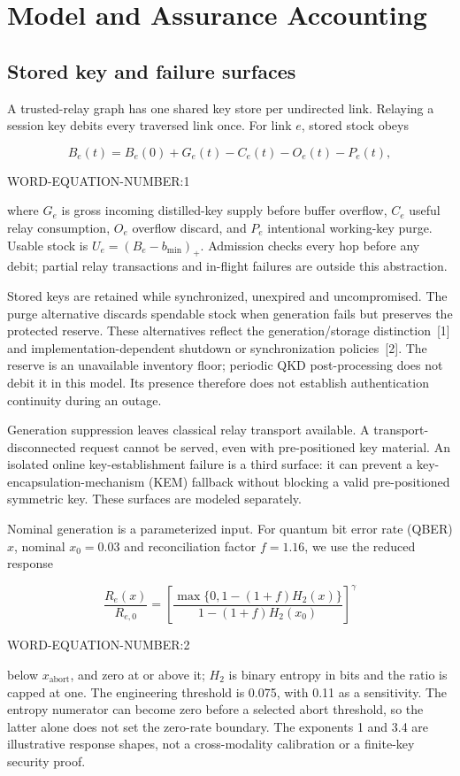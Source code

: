 \documentclass[conference,a4paper]{IEEEtran}
\begin{document}
\section{Model and Assurance Accounting}\label{sec:model}
\subsection{Stored key and failure surfaces}
A trusted-relay graph has one shared key store per undirected link. Relaying a session key debits every traversed link once. For link $e$, stored stock obeys


\[
B_e(t)=B_e(0)+G_e(t)-C_e(t)-O_e(t)-P_e(t),
\]

WORD-EQUATION-NUMBER:1


where $G_e$ is gross incoming distilled-key supply before buffer overflow, $C_e$ useful relay consumption, $O_e$ overflow discard, and $P_e$ intentional working-key purge. Usable stock is $U_e=(B_e-b_{\min})_+$. Admission checks every hop before any debit; partial relay transactions and in-flight failures are outside this abstraction.

Stored keys are retained while synchronized, unexpired and uncompromised. The purge alternative discards spendable stock when generation fails but preserves the protected reserve. These alternatives reflect the generation/storage distinction~[1] and implementation-dependent shutdown or synchronization policies~[2]. The reserve is an unavailable inventory floor; periodic QKD post-processing does not debit it in this model. Its presence therefore does not establish authentication continuity during an outage.

Generation suppression leaves classical relay transport available. A transport-disconnected request cannot be served, even with pre-positioned key material. An isolated online key-establishment failure is a third surface: it can prevent a key-encapsulation-mechanism (KEM) fallback without blocking a valid pre-positioned symmetric key. These surfaces are modeled separately.

Nominal generation is a parameterized input. For quantum bit error rate (QBER) $x$, nominal $x_0=0.03$ and reconciliation factor $f=1.16$, we use the reduced response


\[
\frac{R_e(x)}{R_{e,0}}=\left[\frac{\max\{0,1-(1+f)H_2(x)\}}{1-(1+f)H_2(x_0)}\right]^{\gamma}
\]

WORD-EQUATION-NUMBER:2


below $x_{\mathrm{abort}}$, and zero at or above it; $H_2$ is binary entropy in bits and the ratio is capped at one. The engineering threshold is 0.075, with 0.11 as a sensitivity. The entropy numerator can become zero before a selected abort threshold, so the latter alone does not set the zero-rate boundary. The exponents 1 and 3.4 are illustrative response shapes, not a cross-modality calibration or a finite-key security proof.
\end{document}
